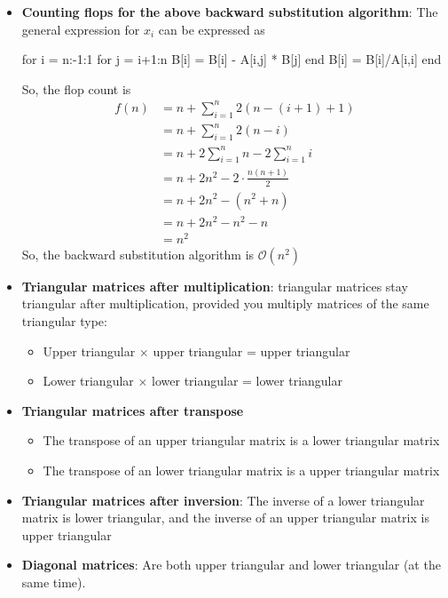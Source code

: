 \documentclass{report}
\begin{document}
\begin{itemize}
        \item \textbf{Counting flops for the above backward substitution algorithm}: The general expression for $x_{i}$ can be expressed as
            \bigbreak \noindent 
            \begin{jlcode}
            for i = n:-1:1
                for j = i+1:n
                    B[i] = B[i] - A[i,j] * B[j]
                end
                B[i] = B[i]/A[i,i]
            end
            \end{jlcode}
            \bigbreak \noindent 
            So, the flop count is
            \begin{align*}
                f(n) &= n+\sum_{i=1}^{n}2(n-(i+1) + 1) \\
                     &=n+\sum_{i=1}^{n}2(n-i) \\
                     &=n+2\sum_{i=1}^{n}n - 2\sum_{i=1}^{n}i \\
                     &= n + 2n^{2} - 2 \cdot \frac{n(n+1)}{2} \\
                     &= n + 2n^{2} - (n^{2} +n) \\
                     &= n + 2n^{2} -n^{2}-n \\
                     &=n^{2}
            \end{align*}
            So, the backward substitution algorithm is $\mathcal{O}(n^{2}) $
        \item \textbf{Triangular matrices after multiplication}:
            triangular matrices stay triangular after multiplication, provided you multiply matrices of the same triangular type:
            \begin{itemize}
                \item Upper triangular $\times$ upper triangular = upper triangular
                \item Lower triangular $\times$ lower triangular = lower triangular
            \end{itemize}
        \item \textbf{Triangular matrices after transpose}
            \begin{itemize}
                \item The transpose of an upper triangular matrix is a lower triangular matrix
                \item The transpose of an lower triangular matrix is a upper triangular matrix
            \end{itemize}
        \item \textbf{Triangular matrices after inversion}: The inverse of a lower triangular matrix is lower triangular, and the inverse of an upper triangular matrix is upper triangular
        \item \textbf{Diagonal matrices}: Are both upper triangular and lower triangular (at the same time).

            
    \end{itemize}
\end{document}
